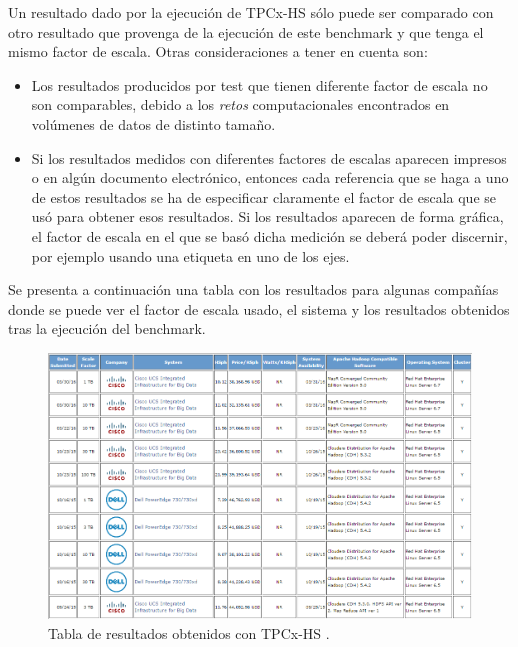 \documentclass[10pt]{article}
\begin{document}
		Un resultado dado por la ejecución de TPCx-HS sólo puede ser comparado con otro resultado que provenga de la ejecución de este benchmark y que tenga el mismo factor de escala. Otras consideraciones a tener en cuenta son:
		
		\begin{itemize}
			\item Los resultados producidos por test que tienen diferente factor de escala no son comparables, debido a los \textit{retos} computacionales encontrados en volúmenes de datos de distinto tamaño.
			\item Si los resultados medidos con diferentes factores de escalas aparecen impresos o en algún documento electrónico, entonces cada referencia que se haga a uno de estos resultados se ha de especificar claramente el factor de escala que se usó para obtener esos resultados. Si los resultados aparecen de forma gráfica, el factor de escala en el que se basó dicha medición se deberá poder discernir, por ejemplo usando una etiqueta en uno de los ejes.
		\end{itemize}
		
		
		Se presenta a continuación una tabla con los resultados para algunas compañías donde se puede ver el factor de escala usado, el sistema y los resultados obtenidos tras la ejecución del benchmark.
		
		\begin{figure}[h]
			\centering
			\includegraphics[width=15cm]{./images/examples.png}
			\caption{Tabla de resultados obtenidos con TPCx-HS \cite{ejemplos}.} 
			\label{fig:ejemplo}
		\end{figure}

\end{document}
